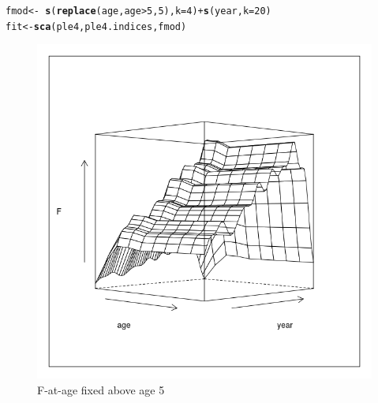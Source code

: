 \documentclass[a4paper,english,10pt]{article}\usepackage[]{graphicx}\usepackage[]{color}
\makeatletter
\def\maxwidth{ %
  \ifdim\Gin@nat@width>\linewidth
    \linewidth
  \else
    \Gin@nat@width
  \fi
}
\newcommand{\hlnum}[1]{\textcolor[rgb]{0.686,0.059,0.569}{#1}}%
\newcommand{\hlopt}[1]{\textcolor[rgb]{0,0,0}{#1}}%
\newcommand{\hlstd}[1]{\textcolor[rgb]{0.345,0.345,0.345}{#1}}%
\newcommand{\hlkwb}[1]{\textcolor[rgb]{0.69,0.353,0.396}{#1}}%
\newcommand{\hlkwc}[1]{\textcolor[rgb]{0.333,0.667,0.333}{#1}}%
\newcommand{\hlkwd}[1]{\textcolor[rgb]{0.737,0.353,0.396}{\textbf{#1}}}%
\newenvironment{kframe}{%
 \def\at@end@of@kframe{}%
 \ifinner\ifhmode%
  \def\at@end@of@kframe{\end{minipage}}%
  \begin{minipage}{\columnwidth}%
 \fi\fi%
 \def\FrameCommand##1{\hskip\@totalleftmargin \hskip-\fboxsep
 \colorbox{shadecolor}{##1}\hskip-\fboxsep
     \hskip-\linewidth \hskip-\@totalleftmargin \hskip\columnwidth}%
 \MakeFramed {\advance\hsize-\width
   \@totalleftmargin\z@ \linewidth\hsize
   \@setminipage}}%
 {\par\unskip\endMakeFramed%
 \at@end@of@kframe}
\newenvironment{knitrout}{}{} %
\makeatother
\begin{document}
\begin{knitrout}
\color{fgcolor}\begin{kframe}
\begin{alltt}
\hlstd{fmod} \hlkwb{<-} \hlopt{~}\hlkwd{s}\hlstd{(}\hlkwd{replace}\hlstd{(age, age} \hlopt{>} \hlnum{5}\hlstd{,} \hlnum{5}\hlstd{),} \hlkwc{k} \hlstd{=} \hlnum{4}\hlstd{)} \hlopt{+} \hlkwd{s}\hlstd{(year,} \hlkwc{k} \hlstd{=} \hlnum{20}\hlstd{)}
\hlstd{fit} \hlkwb{<-} \hlkwd{sca}\hlstd{(ple4, ple4.indices, fmod)}
\end{alltt}
\end{kframe}
\end{knitrout}

\begin{knitrout}
\color{fgcolor}\begin{figure}[H]

{\centering \includegraphics[width=\maxwidth]{figure/rep-1} 

}

\caption[F-at-age fixed above age 5]{F-at-age fixed above age 5}\label{fig:rep}
\end{figure}


\end{knitrout}
\end{document}
